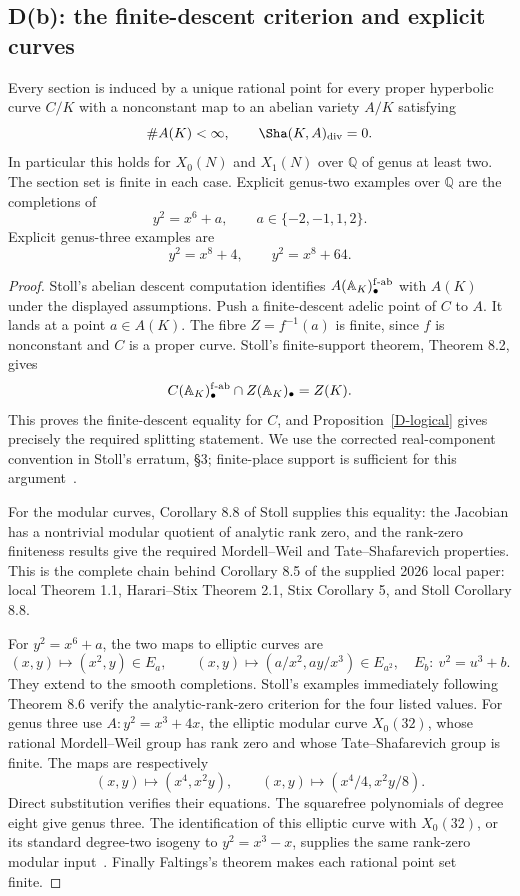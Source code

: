 \subsection{D(b): the finite-descent criterion and explicit curves}

\begin{theorem}
\label{D-Stoll}
Every section is induced by a unique rational point
for every proper hyperbolic curve $C/K$ with a
nonconstant map to an abelian variety $A/K$ satisfying
\[
 \#A(K)<\infty,\qquad
 \Sha(K,A)_{\rm div}=0 .
\]
In particular this holds for $X_0(N)$ and $X_1(N)$
over $\mathbb Q$ of genus at least two. The section
set is finite in each case. Explicit genus-two
examples over $\mathbb Q$ are the completions of
\[
 y^2=x^6+a,\qquad a\in\{-2,-1,1,2\}.
\]
Explicit genus-three examples are
\[
 y^2=x^8+4,\qquad y^2=x^8+64.
\]
\end{theorem}
\begin{proof}
Stoll's abelian descent computation identifies
$A(\mathbb A_K)_\bullet^{\rm f\text{-}ab}$ with $A(K)$
under the displayed assumptions. Push a finite-descent
adelic point of $C$ to $A$. It lands at a point
$a\in A(K)$. The fibre $Z=f^{-1}(a)$ is finite,
since $f$ is nonconstant and $C$ is a proper curve.
Stoll's finite-support theorem, Theorem 8.2, gives
\[
 C(\mathbb A_K)_\bullet^{\rm f\text{-}ab}
 \cap Z(\mathbb A_K)_\bullet=Z(K).
\]
This proves the finite-descent equality for $C$,
and Proposition~\ref{D-logical} gives precisely
the required splitting statement. We use the
corrected real-component convention in Stoll's
erratum, \S3; finite-place support is sufficient
for this argument~\cite{StollErratum}.

For the modular curves, Corollary 8.8 of Stoll
supplies this equality: the Jacobian has a
nontrivial modular quotient of analytic rank zero,
and the rank-zero finiteness results give the
required Mordell--Weil and Tate--Shafarevich
properties. This is the complete chain behind
Corollary 8.5 of the supplied 2026 local paper:
local Theorem 1.1, Harari--Stix Theorem 2.1,
Stix Corollary 5, and Stoll Corollary 8.8.

For $y^2=x^6+a$, the two maps to elliptic curves are
\[
 (x,y)\longmapsto(x^2,y)\in E_a,\qquad
 (x,y)\longmapsto(a/x^2,ay/x^3)\in E_{a^2},
 \quad E_b:\ v^2=u^3+b .
\]
They extend to the smooth completions. Stoll's
examples immediately following Theorem 8.6
verify the analytic-rank-zero criterion for
the four listed values. For genus three use
$A:y^2=x^3+4x$, the elliptic modular curve
$X_0(32)$, whose rational Mordell--Weil group has
rank zero and whose Tate--Shafarevich group is finite.
The maps are respectively
\[
 (x,y)\longmapsto(x^4,x^2y),\qquad
 (x,y)\longmapsto(x^4/4,x^2y/8).
\]
Direct substitution verifies their equations.
The squarefree polynomials of degree eight
give genus three. The identification of this
elliptic curve with $X_0(32)$, or its standard
degree-two isogeny to $y^2=x^3-x$, supplies
the same rank-zero modular input~\cite{X032Model}.
Finally Faltings's theorem makes each rational
point set finite.
\end{proof}

